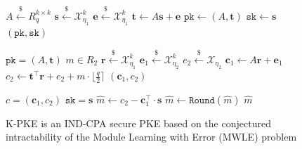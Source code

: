 \documentclass[letterpaper,12pt,titlepage,oneside,final]{book}
\newcommand{\pk}{\texttt{pk}}
\newcommand{\sk}{\texttt{sk}}
\newcommand{\leftsample}{\stackrel{\$}{\leftarrow}}
\begin{document}
\begin{figure}[htbp]
    \centering

    \begin{minipage}[t]{0.33\textwidth}
        \begin{algorithm}[H]
            \caption*{\texttt{K-PKE.KeyGen()}}
            \begin{algorithmic}[1]
                \State $A \leftsample R_q^{k \times k}$
                \State $\mathbf{s} \leftsample \mathcal{X}_{\eta_1}^k$
                \State $\mathbf{e} \leftsample \mathcal{X}_{\eta_1}^k$
                \State $\mathbf{t} \leftarrow A\mathbf{s} + \mathbf{e}$
                \State $\pk \leftarrow (A, \mathbf{t})$
                \State $\sk \leftarrow \mathbf{s}$
                \State \Return $(\pk, \sk)$
            \end{algorithmic}
        \end{algorithm}
    \end{minipage}\hfill
    \begin{minipage}[t]{0.33\textwidth}
        \begin{algorithm}[H]
            \caption*{\texttt{K-PKE.Enc(pk, m)}}
            \begin{algorithmic}[1]
                \Ensure $\pk = (A, \mathbf{t})$
                \Ensure $m \in R_2$
                \State $\mathbf{r} \leftsample \mathcal{X}_{\eta_1}^k$
                \State $\mathbf{e}_1 \leftsample \mathcal{X}_{\eta_2}^k$
                \State $e_2 \leftsample \mathcal{X}_{\eta_2}$
                \State $\mathbf{c}_1 \leftarrow A\mathbf{r} + \mathbf{e}_1$
                \State $c_2 \leftarrow \mathbf{t}^\intercal \mathbf{r} + e_2 + m \cdot \lfloor \frac{q}{2}\rceil$
                \State \Return $(\mathbf{c}_1, c_2)$
            \end{algorithmic}
        \end{algorithm}
    \end{minipage}\hfill
    \begin{minipage}[t]{0.3\textwidth}
        \begin{algorithm}[H]
            \caption*{\texttt{K-PKE.Dec(sk, c)}}
            \begin{algorithmic}[1]
                \Ensure $c = (\mathbf{c}_1, c_2)$
                \Ensure $\sk = \mathbf{s}$
                \State $\hat{m} \leftarrow c_2 - \mathbf{c}_1^\intercal \cdot \mathbf{s}$
                \State $\hat{m} \leftarrow \texttt{Round}(\hat{m})$
                \State \Return $\hat{m}$
            \end{algorithmic}
        \end{algorithm}
    \end{minipage}
    
    \caption{K-PKE is an IND-CPA secure PKE based on the conjectured intractability of the Module Learning with Error (MWLE) problem}\label{fig:k-pke-routines}
\end{figure}
\end{document}
